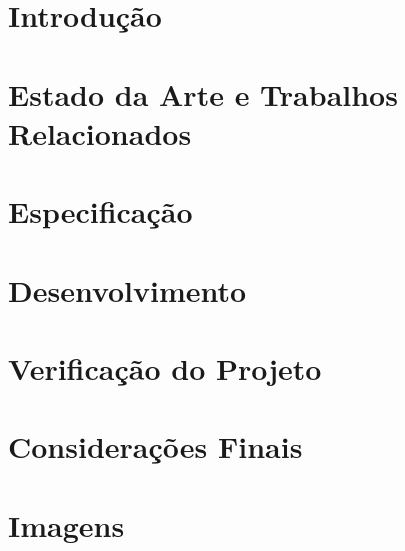 \documentclass[]{politex}
\begin{document}


\sumario


\chapter{Introdução} \label{cap:introducao}


\chapter{Estado da Arte e Trabalhos Relacionados} \label{cap:arte} %


\chapter{Especificação}


\chapter{Desenvolvimento}


\chapter{Verificação do Projeto}


\chapter{Considerações Finais}


\appendix
\chapter{Imagens}



%




\end{document}
